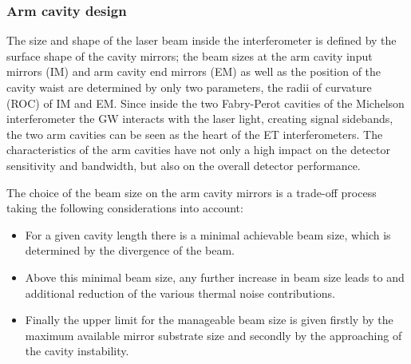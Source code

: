 \subsubsection{Arm cavity design}
\label{sec:arm_cavity_design}

The size and shape of the laser beam inside the interferometer is
defined by the surface shape of the cavity mirrors; the beam sizes
at the arm cavity input mirrors (IM) and arm cavity end mirrors (EM) as well as the position of the cavity waist are determined
by only two parameters, the radii of curvature (ROC) of IM and EM.
Since inside the two Fabry-Perot cavities of the Michelson interferometer the
GW interacts with the laser light, creating signal sidebands, the two
arm cavities can be seen as the heart of the ET interferometers.
The characteristics of the arm cavities have not only a high impact
on the detector sensitivity and bandwidth, but also on the overall
detector performance.

The choice of the beam size on the arm cavity mirrors is a trade-off
process taking the following considerations into account:
\begin{itemize}
  \item For a given cavity length there is a minimal achievable beam size, which
is determined by the divergence of the beam.
\item Above this minimal beam size, any further increase in beam size leads to
and additional reduction of the various thermal noise contributions.
\item Finally the upper limit for the manageable beam size is given firstly by
the maximum available mirror substrate size and secondly by the approaching of
the cavity instability.
\end{itemize}

